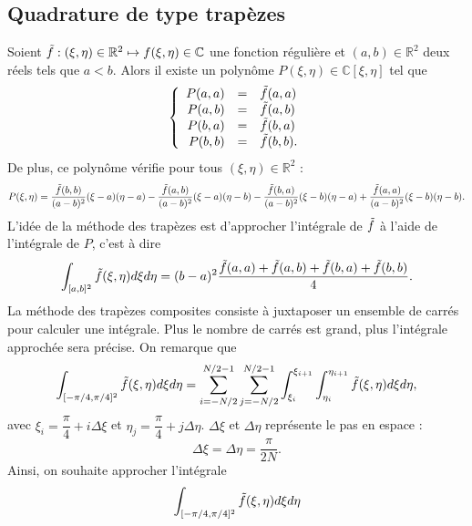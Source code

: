 \subsection{Quadrature de type trapèzes}

Soient $\tilde{f} : (\xi, \eta) \in \mathbb{R}^2 \mapsto f(\xi, \eta) \in \mathbb{C}$ une fonction régulière et $(a,b) \in \mathbb{R}^2$ deux réels tels que $a<b$. Alors il existe un polynôme $P(\xi, \eta) \in \mathbb{C}[\xi, \eta]$ tel que 
\begin{equation}
\left\lbrace
\begin{array}{rcl}
P(a,a) & = & \tilde{f}(a,a) \\
P(a,b) & = & \tilde{f}(a,b) \\
P(b,a) & = & \tilde{f}(b,a) \\
P(b,b) & = & \tilde{f}(b,b).
\end{array}
\right.
\end{equation}
De plus, ce polynôme vérifie pour tous $(\xi, \eta) \in \mathbb{R}^2$ :
\begin{equation}
P(\xi, \eta) = \dfrac{\tilde{f}(b,b)}{(a-b)^2}(\xi-a)(\eta-a) - \dfrac{\tilde{f}(a,b)}{(a-b)^2}(\xi-a)(\eta-b) -\dfrac{\tilde{f}(b,a)}{(a-b)^2}(\xi-b)(\eta-a)+ \dfrac{\tilde{f}(a,a)}{(a-b)^2}(\xi-b)(\eta-b).
\end{equation}
L'idée de la méthode des trapèzes est d'approcher l'intégrale de $\tilde{f}$ à l'aide de l'intégrale de $P$, c'est à dire
\begin{equation}
\displaystyle\int_{[a,b]^2} \tilde{f}(\xi, \eta) d\xi d\eta = (b-a)^2 \dfrac{\tilde{f}(a,a) + \tilde{f}(a,b) + \tilde{f}(b,a) + \tilde{f}(b,b)}{4}.
\label{eq:tpzapprox}
\end{equation}
La méthode des trapèzes composites consiste à juxtaposer un ensemble de carrés pour calculer une intégrale. Plus le nombre de carrés est grand, plus l'intégrale approchée sera précise. On remarque que
\begin{equation}
\displaystyle\int_{[-\pi/4,\pi/4]^2} \tilde{f}(\xi, \eta) d\xi d\eta = \displaystyle\sum\limits_{i=-N/2}^{N/2-1} \displaystyle\sum\limits_{j=-N/2}^{N/2-1} \displaystyle\int_{\xi_i}^{\xi_{i+1}} \displaystyle\int_{\eta_i}^{\eta_{i+1}} \tilde{f}(\xi, \eta) d\xi d\eta,
\end{equation}
avec $\xi_i = \dfrac{\pi}{4} + i \Delta \xi$ et $\eta_j = \dfrac{\pi}{4} + j \Delta \eta$. $\Delta \xi$ et $\Delta \eta$ représente le pas en espace :
\begin{equation}
\Delta \xi = \Delta \eta = \dfrac{\pi}{2N}.
\end{equation}
Ainsi, on souhaite approcher l'intégrale
\begin{equation}
\displaystyle\int_{[-\pi/4,\pi/4]^2} \tilde{f}(\xi, \eta) d\xi d\eta
\end{equation}
